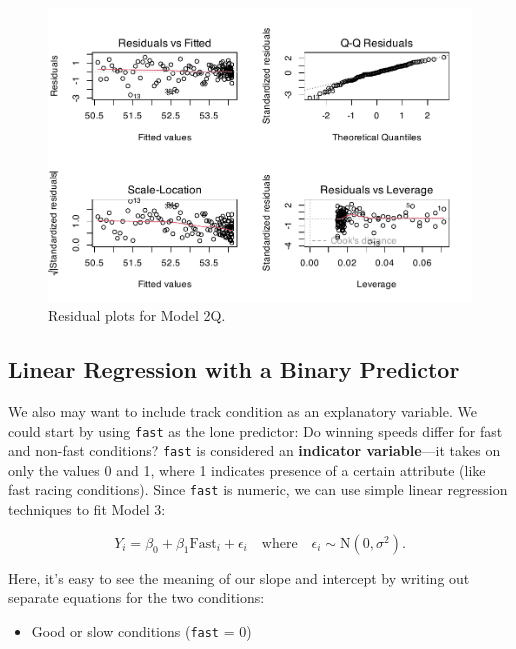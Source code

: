 \documentclass[
]{krantz}
\providecommand{\tightlist}{%
  \setlength{\itemsep}{0pt}\setlength{\parskip}{0pt}}
\begin{document}
\begin{figure}

{\centering \includegraphics[width=0.9\linewidth]{bookdown-BeyondMLR_files/figure-latex/resid2q-1} 

}

\caption{Residual plots for Model 2Q.}\label{fig:resid2q}
\end{figure}

\subsection{Linear Regression with a Binary Predictor}\label{linear-regression-with-a-binary-predictor}

We also may want to include track condition as an explanatory variable. We could start by using \texttt{fast} as the lone predictor: Do winning speeds differ for fast and non-fast conditions? \texttt{fast} is considered an \textbf{indicator variable}---it takes on only the values 0 and 1,  where 1 indicates presence of a certain attribute (like fast racing conditions). Since \texttt{fast} is numeric, we can use simple linear regression techniques to fit Model 3:

\begin{equation}
Y_{i}=\beta_{0}+\beta_{1}\textrm{Fast}_{i}+\epsilon_{i}\quad \textrm{where}\quad \epsilon_{i}\sim \textrm{N}(0,\sigma^2).
\label{eq:model3}
\end{equation}

Here, it's easy to see the meaning of our slope and intercept by writing out separate equations for the two conditions:

\begin{itemize}
\tightlist
\item
  Good or slow conditions (\texttt{fast} = 0)
\end{itemize}
\end{document}
